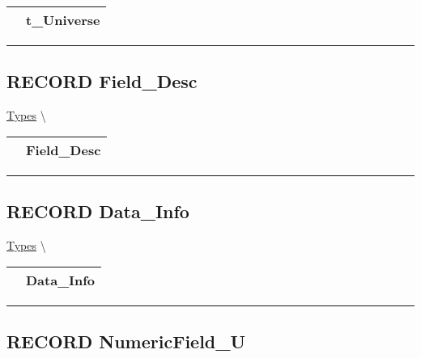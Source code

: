 {\renewcommand{\arraystretch}{1.5}
\begin{tabularx}{\textwidth}{|>{\raggedright\arraybackslash}l|X|}
\hline
\hspace{0pt}\mytexttt{\color{red} } & \textbf{t\_Universe} \\
\hline
\end{tabularx}
}

\par


\rule{\linewidth}{0.5pt}
\subsection*{\textsf{\colorbox{headtoc}{\color{white} RECORD}
Field\_Desc}}

\hypertarget{ecldoc:logisticregression.types.field_desc}{}
\hspace{0pt} \hyperlink{ecldoc:LogisticRegression.Types}{Types} \textbackslash 

{\renewcommand{\arraystretch}{1.5}
\begin{tabularx}{\textwidth}{|>{\raggedright\arraybackslash}l|X|}
\hline
\hspace{0pt}\mytexttt{\color{red} } & \textbf{Field\_Desc} \\
\hline
\end{tabularx}
}

\par


\rule{\linewidth}{0.5pt}
\subsection*{\textsf{\colorbox{headtoc}{\color{white} RECORD}
Data\_Info}}

\hypertarget{ecldoc:logisticregression.types.data_info}{}
\hspace{0pt} \hyperlink{ecldoc:LogisticRegression.Types}{Types} \textbackslash 

{\renewcommand{\arraystretch}{1.5}
\begin{tabularx}{\textwidth}{|>{\raggedright\arraybackslash}l|X|}
\hline
\hspace{0pt}\mytexttt{\color{red} } & \textbf{Data\_Info} \\
\hline
\end{tabularx}
}

\par


\rule{\linewidth}{0.5pt}
\subsection*{\textsf{\colorbox{headtoc}{\color{white} RECORD}
NumericField\_U}}

